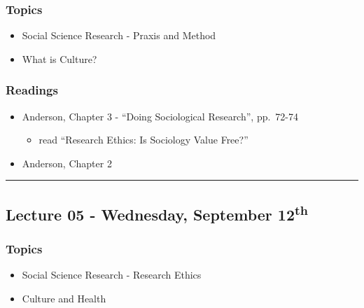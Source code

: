 \documentclass[]{book}
\providecommand{\tightlist}{%
  \setlength{\itemsep}{0pt}\setlength{\parskip}{0pt}}
\theoremstyle{definition}
\theoremstyle{definition}
\theoremstyle{definition}
\theoremstyle{remark}
\begin{document}
\hypertarget{topics-4}{%
\subsubsection*{Topics}\label{topics-4}}

\begin{itemize}
\tightlist
\item
  Social Science Research - Praxis and Method
\item
  What is Culture?
\end{itemize}

\hypertarget{readings-4}{%
\subsubsection*{Readings}\label{readings-4}}

\begin{itemize}
\tightlist
\item
  Anderson, Chapter 3 - ``Doing Sociological Research'', pp.~72-74

  \begin{itemize}
  \tightlist
  \item
    read ``Research Ethics: Is Sociology Value Free?''
  \end{itemize}
\item
  Anderson, Chapter 2
\end{itemize}

\begin{center}\rule{0.5\linewidth}{\linethickness}\end{center}

\hypertarget{lecture-05---wednesday-september-12th}{%
\subsection*{\texorpdfstring{Lecture 05 - Wednesday, September
12\textsuperscript{th}}{Lecture 05 - Wednesday, September 12th}}\label{lecture-05---wednesday-september-12th}}

\hypertarget{topics-5}{%
\subsubsection*{Topics}\label{topics-5}}

\begin{itemize}
\tightlist
\item
  Social Science Research - Research Ethics
\item
  Culture and Health
\end{itemize}
\end{document}
